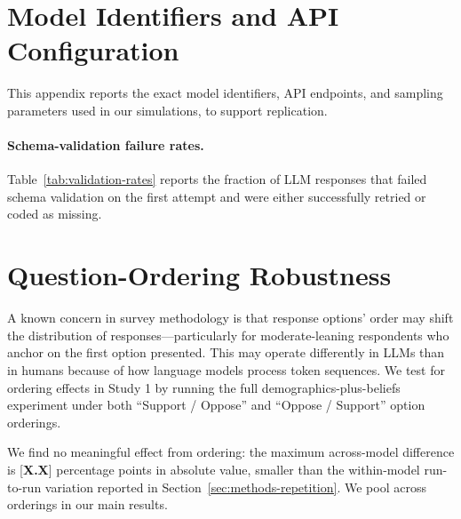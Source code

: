 \documentclass[12pt]{article}
\begin{document}
\section{Model Identifiers and API Configuration}\label{app:model-ids}

This appendix reports the exact model identifiers, API endpoints, and sampling parameters used in our simulations, to support replication.

\label{tab:model-ids-detail}

\paragraph{Schema-validation failure rates.} Table~\ref{tab:validation-rates} reports the fraction of LLM responses that failed schema validation on the first attempt and were either successfully retried or coded as missing.

\label{tab:validation-rates}


\section{Question-Ordering Robustness}\label{app:order-bias}

A known concern in survey methodology is that response options' order may shift the distribution of responses---particularly for moderate-leaning respondents who anchor on the first option presented. This may operate differently in LLMs than in humans because of how language models process token sequences. We test for ordering effects in Study 1 by running the full demographics-plus-beliefs experiment under both ``Support / Oppose'' and ``Oppose / Support'' option orderings.

\label{tab:order-bias}

We find no meaningful effect from ordering: the maximum across-model difference is [\textbf{X.X}] percentage points in absolute value, smaller than the within-model run-to-run variation reported in Section~\ref{sec:methods-repetition}. We pool across orderings in our main results.
\end{document}
